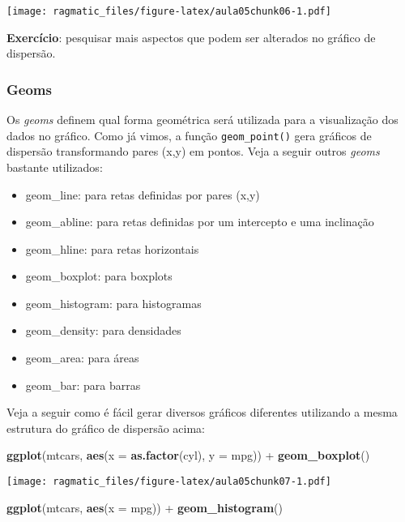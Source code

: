 \documentclass[]{book}
\newenvironment{Shaded}{\begin{snugshade}}{\end{snugshade}}
\newcommand{\KeywordTok}[1]{\textcolor[rgb]{0.13,0.29,0.53}{\textbf{{#1}}}}
\newcommand{\DataTypeTok}[1]{\textcolor[rgb]{0.13,0.29,0.53}{{#1}}}
\newcommand{\StringTok}[1]{\textcolor[rgb]{0.31,0.60,0.02}{{#1}}}
\newcommand{\NormalTok}[1]{{#1}}
\providecommand{\tightlist}{%
  \setlength{\itemsep}{0pt}\setlength{\parskip}{0pt}}
\begin{document}
\texttt{[image: ragmatic\_files/figure-latex/aula05chunk06-1.pdf]}

\textbf{Exercício}: pesquisar mais aspectos que podem ser alterados no
gráfico de dispersão.

\subsubsection{Geoms}\label{geoms}

Os \emph{geoms} definem qual forma geométrica será utilizada para a
visualização dos dados no gráfico. Como já vimos, a função
\texttt{geom\_point()} gera gráficos de dispersão transformando pares
(x,y) em pontos. Veja a seguir outros \emph{geoms} bastante utilizados:

\begin{itemize}
\tightlist
\item
  geom\_line: para retas definidas por pares (x,y)
\item
  geom\_abline: para retas definidas por um intercepto e uma inclinação
\item
  geom\_hline: para retas horizontais
\item
  geom\_boxplot: para boxplots
\item
  geom\_histogram: para histogramas
\item
  geom\_density: para densidades
\item
  geom\_area: para áreas
\item
  geom\_bar: para barras
\end{itemize}

Veja a seguir como é fácil gerar diversos gráficos diferentes utilizando
a mesma estrutura do gráfico de dispersão acima:

\begin{Shaded}
\begin{Highlighting}[]
\KeywordTok{ggplot}\NormalTok{(mtcars, }\KeywordTok{aes}\NormalTok{(}\DataTypeTok{x =} \KeywordTok{as.factor}\NormalTok{(cyl), }\DataTypeTok{y =} \NormalTok{mpg)) +}\StringTok{ }
\StringTok{  }\KeywordTok{geom_boxplot}\NormalTok{()}
\end{Highlighting}
\end{Shaded}

\texttt{[image: ragmatic\_files/figure-latex/aula05chunk07-1.pdf]}

\begin{Shaded}
\begin{Highlighting}[]
\KeywordTok{ggplot}\NormalTok{(mtcars, }\KeywordTok{aes}\NormalTok{(}\DataTypeTok{x =} \NormalTok{mpg)) +}\StringTok{ }
\StringTok{  }\KeywordTok{geom_histogram}\NormalTok{()}
\end{Highlighting}
\end{Shaded}
\end{document}
